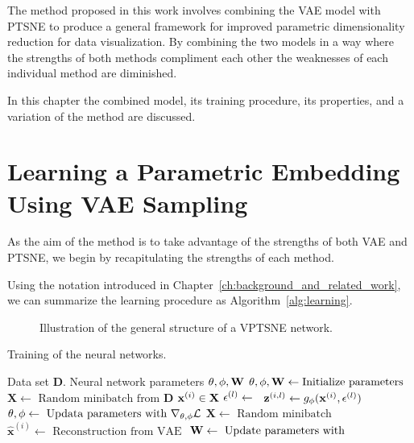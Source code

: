 The method proposed in this work involves combining the VAE model with PTSNE to produce a general framework for improved parametric dimensionality reduction for data visualization. By combining the two models in a way where the strengths of both methods compliment each other the weaknesses of each individual method are diminished.

In this chapter the combined model, its training procedure, its properties, and a variation of the method are discussed.

\section{Learning a Parametric Embedding Using VAE Sampling}

As the aim of the method is to take advantage of the strengths of both VAE and PTSNE, we begin by recapitulating the strengths of each method.


Using the notation introduced in Chapter~\ref{ch:background_and_related_work}, we can summarize the learning procedure as Algorithm~\ref{alg:learning}. 

\begin{figure}[!htb]
  \centering
  \resizebox{0.8\textwidth}{!}{\unskip}
  \caption{Illustration of the general structure of a VPTSNE network.}
  \label{fig:vptsne}
\end{figure}

\begin{algorithm}[H]
  \caption{Training of the neural networks.}
  \label{alg:learning}
  \begin{algorithmic}[1]
    \Require Data set $\mathbf{D}$.
    \Ensure Neural network parameters $\mathbf{\theta}, \mathbf{\phi}, \mathbf{W}$
    \State $\mathbf{\theta}, \mathbf{\phi}, \mathbf{W} \gets \text{Initialize parameters}$
      \State $\mathbf{X} \gets \text{ Random minibatch from } \mathbf{D}$
      \ForAll $\mathbf{x}^{(i)} \in \mathbf{X}$
        \State $\mathbf{\epsilon}^{(l)} \gets$ 
        \State $\mathbf{z}^{(i,l)} \gets g_{\mathbf{\phi}}(\mathbf{x}^{(i)}, \mathbf{\epsilon}^{(l)})$
        \State $\mathbf{\theta}, \mathbf{\phi} \gets \text{ Updata parameters with } \nabla_{\mathbf{\theta}, \mathbf{\phi}} \mathcal{L}$
      \EndFor
    \EndWhile
      \State $\mathbf{X} \gets \text{ Random minibatch }$
      \State $\hat{\mathbf{x}}^{(i)} \gets \text{ Reconstruction from VAE }$ 
      \State $\mathbf{W} \gets \text{ Update parameters with }$
    \EndWhile
  \end{algorithmic}
\end{algorithm}

